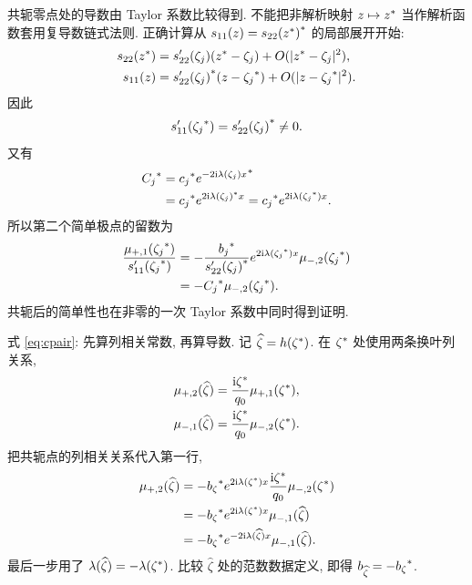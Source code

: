 \par\smallskip\noindent 共轭零点处的导数由 Taylor 系数比较得到.\quad
不能把非解析映射 $z\mapsto{z}^{*}$ 当作解析函数套用复导数链式法则.
正确计算从
$s_{11}(z)={s_{22}({z}^{*})}^{*}$ 的局部展开开始:
\begin{align*}
s_{22}({z}^{*})
&=s_{22}'(\zeta_j)({z}^{*}-\zeta_j)
+O(|{z}^{*}-\zeta_j|^2),\\
s_{11}(z)
&={s_{22}'(\zeta_j)}^{*}(z-{\zeta_j}^{*})
+O(|z-{\zeta_j}^{*}|^2).
\end{align*}
因此
\begin{equation*}
s_{11}'({\zeta_j}^{*})={s_{22}'(\zeta_j)}^{*}\ne0.
\end{equation*}
又有
\begin{align*}
{C_j}^{*}
&={c_j}^{*}{e^{-2\mathrm{i}\lambda(\zeta_j)x}}^{*}\\
&={c_j}^{*}e^{2\mathrm{i}{\lambda(\zeta_j)}^{*}x}
={c_j}^{*}e^{2\mathrm{i}\lambda({\zeta_j}^{*})x}.
\end{align*}
所以第二个简单极点的留数为
\begin{align*}
\dfrac{\mu_{+,1}({\zeta_j}^{*})}{s_{11}'({\zeta_j}^{*})}
&=-\dfrac{{b_j}^{*}}{{s_{22}'(\zeta_j)}^{*}}
 e^{2\mathrm{i}\lambda({\zeta_j}^{*})x}\mu_{-,2}({\zeta_j}^{*})\\
&=-{C_j}^{*}\mu_{-,2}({\zeta_j}^{*}).
\end{align*}
共轭后的简单性也在非零的一次 Taylor 系数中同时得到证明.

\par\smallskip\noindent 式 \eqref{eq:cpair}: 先算列相关常数, 再算导数.\quad
记 $\widehat\zeta=h({\zeta}^{*})$. 在 ${\zeta}^{*}$ 处使用两条换叶列关系,
\begin{align*}
\mu_{+,2}(\widehat\zeta)
&=\dfrac{\mathrm{i}{\zeta}^{*}}{q_0}\mu_{+,1}({\zeta}^{*}),\\
\mu_{-,1}(\widehat\zeta)
&=\dfrac{\mathrm{i}{\zeta}^{*}}{q_0}\mu_{-,2}({\zeta}^{*}).
\end{align*}
把共轭点的列相关关系代入第一行,
\begin{align*}
\mu_{+,2}(\widehat\zeta)
&=-{b_\zeta}^{*}e^{2\mathrm{i}\lambda({\zeta}^{*})x}
\dfrac{\mathrm{i}{\zeta}^{*}}{q_0}\mu_{-,2}({\zeta}^{*})\\
&=-{b_\zeta}^{*}e^{2\mathrm{i}\lambda({\zeta}^{*})x}
\mu_{-,1}(\widehat\zeta)\\
&=-{b_\zeta}^{*}e^{-2\mathrm{i}\lambda(\widehat\zeta)x}
\mu_{-,1}(\widehat\zeta).
\end{align*}
最后一步用了 $\lambda(\widehat\zeta)=-\lambda({\zeta}^{*})$.
比较 $\widehat\zeta$ 处的范数数据定义, 即得
$b_{\widehat\zeta}=-{b_\zeta}^{*}$.

